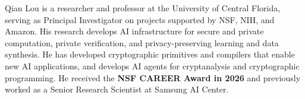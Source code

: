 Qian Lou is a researcher and professor at the University of Central Florida, serving as Principal Investigator on projects supported by NSF, NIH, and Amazon. His research develops AI infrastructure for secure and private computation, private verification, and privacy-preserving learning and data synthesis. He has developed cryptographic primitives and compilers that enable new AI applications, and develops AI agents for cryptanalysis and cryptographic programming. He received the \textbf{NSF CAREER Award in 2026} and previously worked as a Senior Research Scientist at Samsung AI Center.
